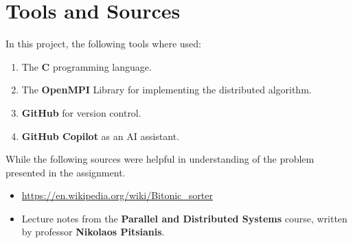 \documentclass[12pt]{report}
\begin{document}
\chapter{Tools and Sources}
    In this project, the following tools where used:
    \begin{enumerate}
        \item The \textbf{C} programming language.
        \item The \textbf{OpenMPI} Library for implementing the distributed algorithm.
        \item \textbf{GitHub} for version control.
        \item \textbf{GitHub Copilot} as an AI assistant.
    \end{enumerate}
    While the following sources were helpful in understanding of the problem presented in the assignment.
    \begin{itemize}
        \item \url{https://en.wikipedia.org/wiki/Bitonic_sorter}
        \item Lecture notes from the \textbf{Parallel and Distributed Systems} course, written by professor \textbf{Nikolaos Pitsianis}.
    \end{itemize}
\end{document}
